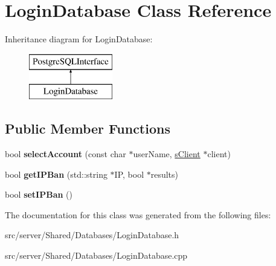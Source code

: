 \hypertarget{class_login_database}{\section{Login\-Database Class Reference}
\label{class_login_database}
}
Inheritance diagram for Login\-Database\-:\begin{figure}[H]
\begin{center}
\leavevmode
\includegraphics[height=2.000000cm]{class_login_database}
\end{center}
\end{figure}
\subsection*{Public Member Functions}
\begin{DoxyCompactItemize}
\item 
\hypertarget{class_login_database_a74087482da1d24ad9696d8d01567b060}{bool {\bfseries select\-Account} (const char $\ast$user\-Name, \hyperlink{structs_client}{s\-Client} $\ast$client)}\label{class_login_database_a74087482da1d24ad9696d8d01567b060}

\item 
\hypertarget{class_login_database_a5f832944039f157abb45cb1fe466e9e9}{bool {\bfseries get\-I\-P\-Ban} (std\-::string $\ast$I\-P, bool $\ast$results)}\label{class_login_database_a5f832944039f157abb45cb1fe466e9e9}

\item 
\hypertarget{class_login_database_af107de3014fcced25a111490455d76d5}{bool {\bfseries set\-I\-P\-Ban} ()}\label{class_login_database_af107de3014fcced25a111490455d76d5}

\end{DoxyCompactItemize}


The documentation for this class was generated from the following files\-:\begin{DoxyCompactItemize}
\item 
src/server/\-Shared/\-Databases/Login\-Database.\-h\item 
src/server/\-Shared/\-Databases/Login\-Database.\-cpp\end{DoxyCompactItemize}
